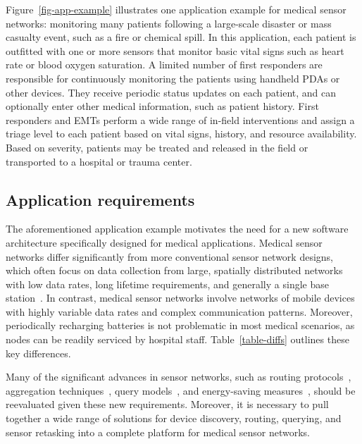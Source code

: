 Figure~\ref{fig-app-example} illustrates one application example for
medical sensor networks: monitoring many patients following a
large-scale disaster or mass casualty event, such as a fire or
chemical spill. In this application, each patient is outfitted with
one or more sensors that monitor basic vital signs such as heart rate
or blood oxygen saturation. A limited number of first responders are
responsible for continuously monitoring the patients using handheld
PDAs or other devices.  They receive periodic status updates on each
patient, and can optionally enter other medical information, such as
patient history.  First responders and EMTs perform a wide range of
in-field interventions and assign a triage level to each patient based
on vital signs, history, and resource availability.  Based on
severity, patients may be treated and released in the field or
transported to a hospital or trauma center.

\subsection{Application requirements}

The aforementioned application example motivates the need for a new
software architecture specifically designed for medical applications.
Medical sensor networks differ significantly from more conventional
sensor network designs, which often focus on data collection from large,
spatially distributed networks with low data rates, long lifetime
requirements, and generally a single base
station~\cite{cerpa-habitat,gdi,redwoods,intel-industrial}.  In
contrast, medical sensor networks involve networks of mobile devices
with highly variable data rates and complex communication
patterns. Moreover, periodically recharging batteries is not
problematic in most medical scenarios, as nodes can be readily
serviced by hospital staff.  Table~\ref{table-diffs} outlines these
key differences.

Many of the significant advances in sensor networks, such as routing
protocols~\cite{diffusion,awoo-multihop}, aggregation
techniques~\cite{tinydb-osdi,beyond-average,diffusion}, query
models~\cite{tinydb-sigmod,cougar-sigmodrecord}, and energy-saving
measures~\cite{s-mac,b-mac,sp-sensys05}, should be reevaluated given
these new requirements. Moreover, it is necessary to pull together a
wide range of solutions for device discovery, routing, querying, and
sensor retasking into a complete platform for medical sensor
networks.

